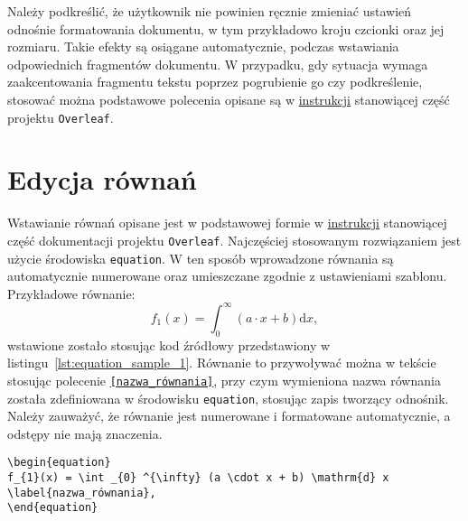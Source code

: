 Należy podkreślić, że użytkownik nie powinien ręcznie zmieniać ustawień odnośnie formatowania dokumentu, w tym przykładowo kroju czcionki oraz jej rozmiaru. Takie efekty są osiągane automatycznie, podczas wstawiania odpowiednich fragmentów dokumentu. W przypadku, gdy sytuacja wymaga zaakcentowania fragmentu tekstu poprzez pogrubienie go czy podkreślenie, stosować można podstawowe polecenia opisane są w \href{https://www.overleaf.com/learn/latex/Font_sizes%2C_families%2C_and_styles}{instrukcji} stanowiącej część projektu \texttt{Overleaf}.

\section{Edycja równań}

Wstawianie równań opisane jest w podstawowej formie w \href{https://www.overleaf.com/learn/latex/Mathematical_expressions}{instrukcji} stanowiącej część dokumentacji projektu \texttt{Overleaf}. Najczęściej stosowanym rozwiązaniem jest użycie środowiska \texttt{equation}. W ten sposób wprowadzone równania są automatycznie numerowane oraz umieszczane zgodnie z ustawieniami szablonu. Przykładowe równanie:
\begin{equation}
f_{1}(x) = \int _{0} ^{\infty} (a \cdot x + b) \mathrm{d}x \label{eq:equation_sample_1},
\end{equation}
wstawione zostało stosując kod źródłowy przedstawiony w listingu~\ref{lst:equation_sample_1}. Równanie to przywoływać można w tekście stosując polecenie \texttt{\eqref{nazwa_równania}}, przy czym wymieniona nazwa równania została zdefiniowana w środowisku \texttt{equation}, stosując zapis \texttt{\label{nazwa_równania}} tworzący odnośnik. Należy zauważyć, że równanie jest numerowane i formatowane automatycznie, a odstępy nie mają znaczenia.

\begin{listing}[htb]
\begin{verbatim}
\begin{equation}
f_{1}(x) = \int _{0} ^{\infty} (a \cdot x + b) \mathrm{d} x \label{nazwa_równania},
\end{equation}
\end{verbatim}
\end{listing}

